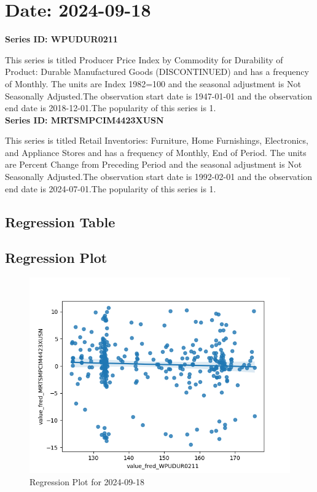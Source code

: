 \section{Date: 2024-09-18}
\noindent \textbf{Series ID: WPUDUR0211} 

\noindent This series is titled Producer Price Index by Commodity for Durability of Product: Durable Manufactured Goods (DISCONTINUED) and has a frequency of Monthly. The units are Index 1982=100 and the seasonal adjustment is Not Seasonally Adjusted.The observation start date is 1947-01-01 and the observation end date is 2018-12-01.The popularity of this series is 1. \\ 

\noindent \textbf{Series ID: MRTSMPCIM4423XUSN} 

\noindent This series is titled Retail Inventories: Furniture, Home Furnishings, Electronics, and Appliance Stores and has a frequency of Monthly, End of Period. The units are Percent Change from Preceding Period and the seasonal adjustment is Not Seasonally Adjusted.The observation start date is 1992-02-01 and the observation end date is 2024-07-01.The popularity of this series is 1. \\ 

\subsection{Regression Table}


\subsection{Regression Plot}
\begin{figure}
\centering
\includegraphics[scale = 0.9]{plots/plot_2024-09-18.png}
\caption{Regression Plot for 2024-09-18}
\end{figure}
\newpage
